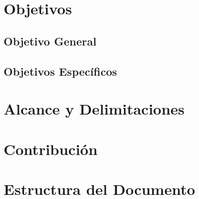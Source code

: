 \section{Objetivos}
\subsection{Objetivo General}
\subsection{Objetivos Específicos}

\section{Alcance y Delimitaciones}

\section{Contribución}

\section{Estructura del Documento}
